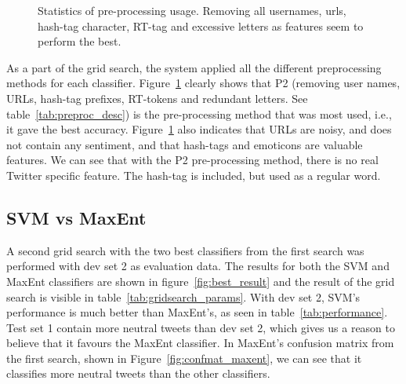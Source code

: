\begin{figure}[!htb]
	\centering
	\caption[Statistics of pre-processing usage.]{Statistics of pre-processing usage. Removing all usernames, urls, hash-tag character, RT-tag and excessive letters as features seem to perform the best.}
	\label{fig:preprocess_usage}
\end{figure}

As a part of the grid search, the system applied all the different preprocessing methods for each classifier. Figure~\ref{fig:preprocess_usage} clearly shows that P2 (removing user names, URLs, hash-tag prefixes, RT-tokens and redundant letters. See table~\ref{tab:preproc_desc}) is the pre-processing method that was most used, i.e., it gave the best accuracy. Figure~\ref{fig:preprocess_usage} also indicates that URLs are noisy, and does not contain any sentiment, and that hash-tags and emoticons are valuable features. We can see that with the P2 pre-processing method, there is no real Twitter specific feature. The hash-tag is included, but used as a regular word.

\subsection{SVM vs MaxEnt}
A second grid search with the two best classifiers from the first search was performed with dev set 2 as evaluation data. The results for both the SVM and MaxEnt classifiers are shown in figure~\ref{fig:best_result} and the result of the grid search is visible in table~\ref{tab:gridsearch_params}. With dev set 2, SVM's performance is much better than MaxEnt's, as seen in table~\ref{tab:performance}. Test set 1 contain more neutral tweets than dev set 2, which gives us a reason to believe that it favours the MaxEnt classifier. In MaxEnt's confusion matrix from the first search, shown in Figure~\ref{fig:confmat_maxent}, we can see that it classifies more neutral tweets than the other classifiers.

